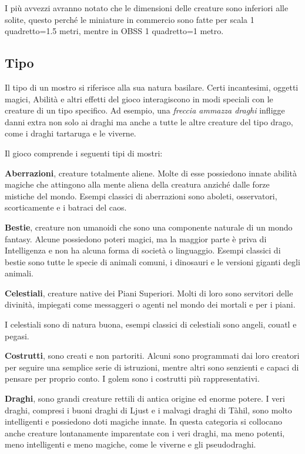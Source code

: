 I più avvezzi avranno notato che le dimensioni delle creature sono inferiori alle solite, questo perché le miniature in commercio sono fatte per scala 1 quadretto=1.5 metri, mentre in OBSS 1 quadretto=1 metro.

\begin{multicols}{2}

\subsection{Tipo}

Il tipo di un mostro si riferisce alla sua natura basilare. Certi incantesimi, oggetti magici, Abilità e altri effetti del gioco interagiscono in modi speciali con le creature di un tipo specifico. Ad esempio, una \emph{freccia ammazza draghi} infligge danni extra non solo ai draghi ma anche a tutte le altre creature del tipo drago, come i draghi tartaruga e le viverne.

Il gioco comprende i seguenti tipi di mostri:

\smallskip\textbf{Aberrazioni}, creature totalmente aliene. Molte di esse possiedono innate abilità magiche che attingono alla mente aliena della creatura anziché dalle forze mistiche del mondo. Esempi classici di aberrazioni sono aboleti, osservatori, scorticamente e i batraci del caos.

\smallskip\textbf{Bestie}, creature non umanoidi che sono una componente naturale di un mondo fantasy. Alcune possiedono poteri magici, ma la maggior parte è priva di Intelligenza e non ha alcuna forma di società o linguaggio. Esempi classici di bestie sono tutte le specie di animali comuni, i dinosauri e le versioni giganti degli animali.

\smallskip\textbf{Celestiali}, creature native dei Piani Superiori. Molti di loro sono servitori delle divinità, impiegati come messaggeri o agenti nel mondo dei mortali e per i piani.

\medskip

I celestiali sono di natura buona, esempi classici di celestiali sono angeli, couatl e pegasi.

\smallskip\textbf{Costrutti}, sono creati e non partoriti. Alcuni sono programmati dai loro creatori per seguire una semplice serie di istruzioni, mentre altri sono senzienti e capaci di pensare per proprio conto. I golem sono i costrutti più rappresentativi.

\smallskip\textbf{Draghi}, sono grandi creature rettili di antica origine ed enorme potere. I veri draghi, compresi i buoni draghi di Ljust e i malvagi draghi di Tàhil, sono molto intelligenti e possiedono doti magiche innate. In questa categoria si collocano anche creature lontanamente imparentate con i veri draghi, ma meno potenti, meno intelligenti e meno magiche, come le viverne e gli pseudodraghi.


\end{multicols}
